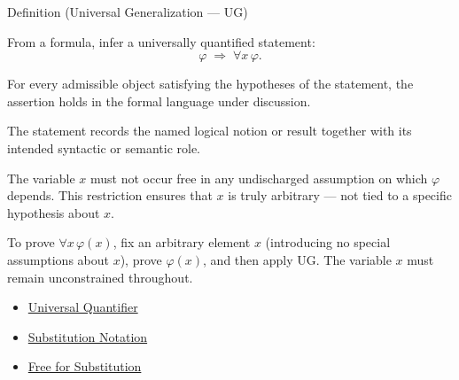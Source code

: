 \begin{definitionbox}{Definition (Universal Generalization --- UG)}
\begin{definition}\label{def:ug}
From a formula, infer a universally quantified statement:
\[
\varphi \;\Rightarrow\; \forall x\,\varphi.
\]
\end{definition}
\end{definitionbox}
\begin{remark*}
For every admissible object satisfying the hypotheses of the statement, the
assertion holds in the formal language under discussion.
\end{remark*}

\begin{remark*}[Interpretation]
The statement records the named logical notion or result together with its
intended syntactic or semantic role.
\end{remark*}


\begin{remark*}[Exposition]
The variable $x$ must not occur free in any undischarged assumption on which
$\varphi$ depends. This restriction ensures that $x$ is truly arbitrary ---
not tied to a specific hypothesis about $x$.
\end{remark*}

\begin{remark*}[Exposition]
To prove $\forall x\,\varphi(x)$, fix an arbitrary element $x$ (introducing no
special assumptions about $x$), prove $\varphi(x)$, and then apply UG. The
variable $x$ must remain unconstrained throughout.
\end{remark*}


\begin{dependencies}
\begin{itemize}
  \item \hyperref[def:universal-q]{Universal Quantifier}
  \item \hyperref[def:subst-notation]{Substitution Notation}
  \item \hyperref[def:free-for]{Free for Substitution}
\end{itemize}
\end{dependencies}

